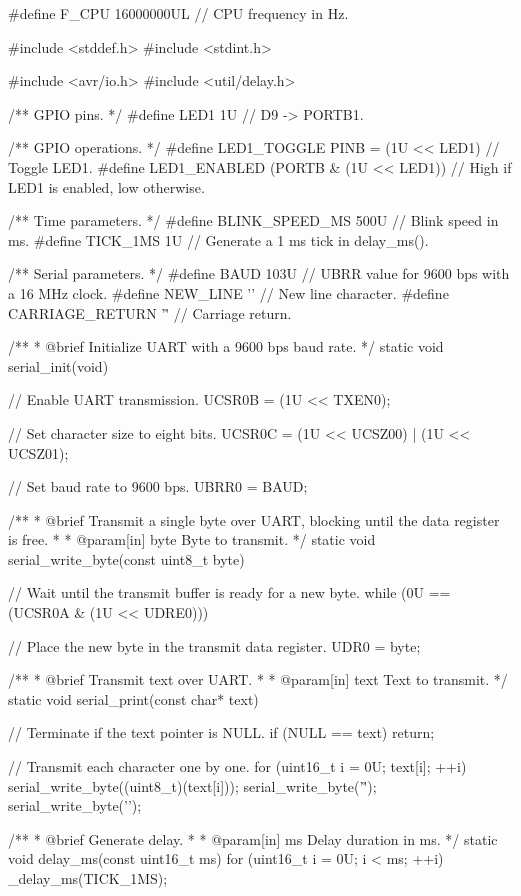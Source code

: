 \begin{ccode}
#define F_CPU 16000000UL // CPU frequency in Hz.

#include <stddef.h>
#include <stdint.h>

#include <avr/io.h>
#include <util/delay.h>

/** GPIO pins. */
#define LED1 1U // D9  -> PORTB1.

/** GPIO operations. */
#define LED1_TOGGLE PINB = (1U << LED1)    // Toggle LED1.
#define LED1_ENABLED (PORTB & (1U << LED1)) // High if LED1 is enabled, low otherwise.

/** Time parameters. */
#define BLINK_SPEED_MS 500U // Blink speed in ms.
#define TICK_1MS 1U         // Generate a 1 ms tick in delay_ms().

/** Serial parameters. */
#define BAUD 103U            // UBRR value for 9600 bps with a 16 MHz clock.
#define NEW_LINE '\n'        // New line character.
#define CARRIAGE_RETURN '\r' // Carriage return.

/**
 * @brief Initialize UART with a 9600 bps baud rate.
 */
static void serial_init(void)
{
    // Enable UART transmission.
    UCSR0B = (1U << TXEN0);

    // Set character size to eight bits.
    UCSR0C = (1U << UCSZ00) | (1U << UCSZ01);

    // Set baud rate to 9600 bps.
    UBRR0 = BAUD;
}

/**
 * @brief Transmit a single byte over UART, blocking until the data register is free.
 *
 * @param[in] byte Byte to transmit.
 */
static void serial_write_byte(const uint8_t byte)
{
    // Wait until the transmit buffer is ready for a new byte.
    while (0U == (UCSR0A & (1U << UDRE0))) {}

    // Place the new byte in the transmit data register.
    UDR0 = byte;
}

/**
 * @brief Transmit text over UART.
 *
 * @param[in] text Text to transmit.
 */
static void serial_print(const char* text)
{
    // Terminate if the text pointer is NULL.
    if (NULL == text) { return; }

    // Transmit each character one by one.
    for (uint16_t i = 0U; text[i]; ++i)
    {
        serial_write_byte((uint8_t)(text[i]));
    }
    serial_write_byte('\r');
    serial_write_byte('\n');
}

/**
 * @brief Generate delay.
 *
 * @param[in] ms Delay duration in ms.
 */
static void delay_ms(const uint16_t ms)
{
    for (uint16_t i = 0U; i < ms; ++i)
    {
        _delay_ms(TICK_1MS);
    }
}


\end{ccode}
